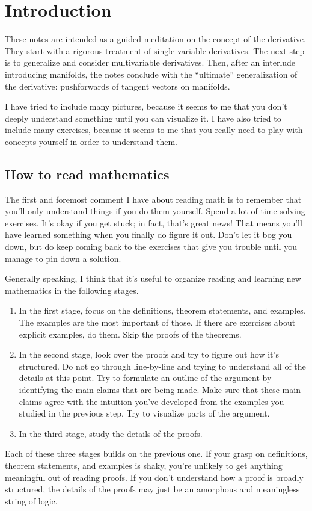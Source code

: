 \chapter*{Introduction}

These notes are intended as a guided meditation on the concept of the derivative. They start with a rigorous treatment of single variable derivatives. The next step is to generalize and consider multivariable derivatives. Then, after an interlude introducing manifolds, the notes conclude with the ``ultimate'' generalization of the derivative: pushforwards of tangent vectors on manifolds.

I have tried to include many pictures, because it seems to me that you don't deeply understand something until you can visualize it. I have also tried to include many exercises, because it seems to me that you really need to play with concepts yourself in order to understand them. 

\section*{How to read mathematics}

The first and foremost comment I have about reading math is to remember that you'll only understand things if you do them yourself. Spend a lot of time solving exercises. It's okay if you get stuck; in fact, that's great news! That means you'll have learned something when you finally do figure it out. Don't let it bog you down, but do keep coming back to the exercises that give you trouble until you manage to pin down a solution. 

Generally speaking, I think that it's useful to organize reading and learning new mathematics in the following stages. 
\begin{enumerate}[(1)]
	\item In the first stage, focus on the definitions, theorem statements, and examples. The examples are the most important of those. If there are exercises about explicit examples, do them. Skip the proofs of the theorems. 
	
	\item In the second stage, look over the proofs and try to figure out how it's structured. Do not go through line-by-line and trying to understand all of the details at this point. Try to formulate an outline of the argument by identifying the main claims that are being made. Make sure that these main claims agree with the intuition you've developed from the examples you studied in the previous step. Try to visualize parts of the argument. 
	
	\item In the third stage, study the details of the proofs. 
\end{enumerate}
Each of these three stages builds on the previous one. If your grasp on definitions, theorem statements, and examples is shaky, you're unlikely to get anything meaningful out of reading proofs. If you don't understand how a proof is broadly structured, the details of the proofs may just be an amorphous and meaningless string of logic. 

